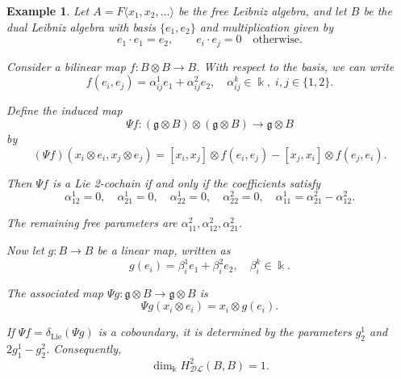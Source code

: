 \documentclass[a4paper, 12pt,oneside,reqno]{amsart}
\newcommand{\DL}{\mathcal{DL}}
\newtheorem{example}[theorem]{Example}
\begin{document}
\begin{example} \label{exm:4.6}
    Let \(A = F\langle x_1, x_2, \dots \rangle\) be the free Leibniz algebra, and let \(B\) be the dual Leibniz algebra with basis \(\{e_1, e_2\}\) and multiplication given by  
    \[
    e_1 \cdot e_1 = e_2, \qquad e_i \cdot e_j = 0 \quad \text{otherwise}.
    \]
    
    Consider a bilinear map \(f : B \otimes B \to B\). With respect to the basis, we can write  
    \[
    f(e_i, e_j) = \alpha^1_{ij} e_1 + \alpha^2_{ij} e_2, \quad \alpha^k_{ij} \in \Bbbk,\; i,j \in \{1,2\}.
    \]
    
    Define the induced map  
    \[
    \Psi f : (\mathfrak{g} \otimes B) \otimes (\mathfrak{g} \otimes B) \to \mathfrak{g} \otimes B
    \]
    by  
    \[
    (\Psi f)(x_i \otimes e_i, x_j \otimes e_j) = [x_i, x_j] \otimes f(e_i, e_j) - [x_j, x_i] \otimes f(e_j, e_i).
    \]
    
    Then \(\Psi f\) is a Lie 2-cochain if and only if the coefficients satisfy  
    \[
    \alpha^1_{12}=0,\quad \alpha^1_{21}=0,\quad \alpha^1_{22}=0,\quad
    \alpha^2_{22}=0,\quad
    \alpha^1_{11}=\alpha^2_{21}-\alpha^2_{12}.
    \]
    
    The remaining free parameters are \(\alpha^2_{11}, \alpha^2_{12}, \alpha^2_{21}\).
    
    Now let \(g : B \to B\) be a linear map, written as  
    \[
    g(e_i) = \beta^1_i e_1 + \beta^2_i e_2, \quad \beta^k_i \in \Bbbk.
    \]
    
    The associated map \(\Psi g : \mathfrak{g} \otimes B \to \mathfrak{g} \otimes B\) is  
    \[
    \Psi g (x_i \otimes e_i) = x_i \otimes g(e_i).
    \]
    
    If \(\Psi f = \delta_{\text{Lie}}(\Psi g)\) is a coboundary, it is determined by the parameters \(g^1_2\) and \(2g^1_1 - g^2_2\). Consequently,  
    \[
    \dim_{\Bbbk} H_{\DL}^2(B, B) = 1.
    \]
\end{example}
\end{document}
